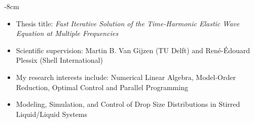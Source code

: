 \documentclass[10pt,a4paper]{altacv}
\begin{document}

\begin{adjustwidth}{}{-8cm}
\makecvheader
\end{adjustwidth}


\begin{itemize}
\item Thesis title: \textit{Fast Iterative Solution of the Time-Harmonic Elastic Wave Equation at Multiple Frequencies}
\item Scientific supervision: Martin B. Van Gijzen (TU Delft) and Ren\'e-\'Edouard  Plessix (Shell International)
\item My research interests include: Numerical Linear Algebra, Model-Order Reduction, Optimal Control and Parallel Programming
\end{itemize}

\divider

\begin{itemize}
\item Modeling, Simulation, and Control of Drop Size Distributions in Stirred Liquid/Liquid Systems
\end{itemize}
\end{document}
